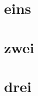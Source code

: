 \documentclass[english,ngerman,abstract=on,titlepage=on,twoside]{tudscrartcl}
\begin{document}
\section{eins}
\Blindtext\blindtext
\section{zwei}
\Blindtext\blindtext
\begin{abstract}[pagestyle=headings]
\blindtext
\Blindtext
\end{abstract}
\Blindtext\blindtext
\section{drei}
\Blindtext\blindtext
\Blindtext

\makeatletter
\meaning\@mkboth
\end{document}
